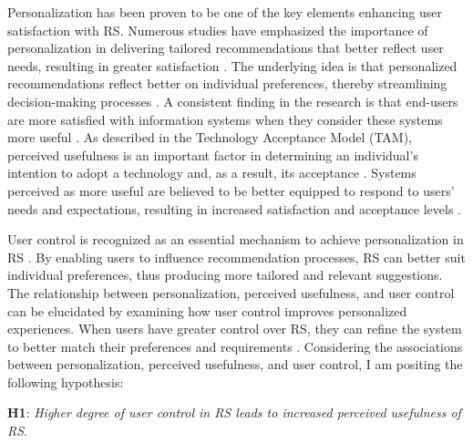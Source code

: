 \documentclass[a4paper,12pt]{article}
\begin{document}
Personalization has been proven to be one of the key elements enhancing user satisfaction with RS. Numerous studies have emphasized the importance of personalization in delivering tailored recommendations that better reflect user needs, resulting in greater satisfaction \citep{bostandjiev2012tasteweights, hijikata2012relation, knijnenburgExplainingUserExperience2012, songWhenHowDiversify2019}. The underlying idea is that personalized recommendations reflect better on individual preferences, thereby streamlining decision-making processes \citep{adomavicius2005toward}. A consistent finding in the research is that end-users are more satisfied with information systems when they consider these systems more useful \citep{mahmood2000variables, venkatesh2003utaut}. As described in the Technology Acceptance Model (TAM), perceived usefulness is an important factor in determining an individual's intention to adopt a technology and, as a result, its acceptance \citep{davis1985technology}. Systems perceived as more useful are believed to be better equipped to respond to users' needs and expectations, resulting in increased satisfaction and acceptance levels \citep{venkateshTechnologyAcceptanceModel2008}.

User control is recognized as an essential mechanism to achieve personalization in RS \citep{jannach2017user}. By enabling users to influence recommendation processes, RS can better suit individual preferences, thus producing more tailored and relevant suggestions. The relationship between personalization, perceived usefulness, and user control can be elucidated by examining how user control improves personalized experiences. When users have greater control over RS, they can refine the system to better match their preferences and requirements \citep{chen2014designing}. Considering the associations between personalization, perceived usefulness, and user control, I am positing the following hypothesis:

\textbf{H1}:  \textit{Higher degree of user control in RS leads to increased perceived usefulness of RS}. 
\end{document}

